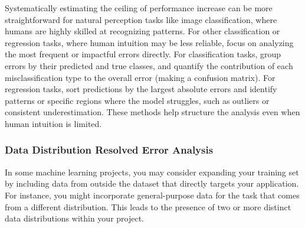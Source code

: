 \documentclass[12pt,openany]{book}
\begin{document}
\begin{table}[ht]
\caption{Example predictions with noise and bandwidth effects.}
\label{tab:example_predictions}
\centering
{}
\end{table}


Systematically estimating the ceiling of performance increase can be more straightforward for natural perception tasks like image classification, where humans are highly skilled at recognizing patterns. For other classification or regression tasks, where human intuition may be less reliable, focus on analyzing the most frequent or impactful errors directly. For classification tasks, group errors by their predicted and true classes, and quantify the contribution of each misclassification type to the overall error (making a confusion matrix). For regression tasks, sort predictions by the largest absolute errors and identify patterns or specific regions where the model struggles, such as outliers or consistent underestimation. These methods help structure the analysis even when human intuition is limited.

\subsubsection{Data Distribution Resolved Error Analysis}

In some machine learning projects, you may consider expanding your training set by including data from outside the dataset that directly targets your application. For instance, you might incorporate general-purpose data for the task that comes from a different distribution. This leads to the presence of two or more distinct data distributions within your project. \newline
\end{document}
